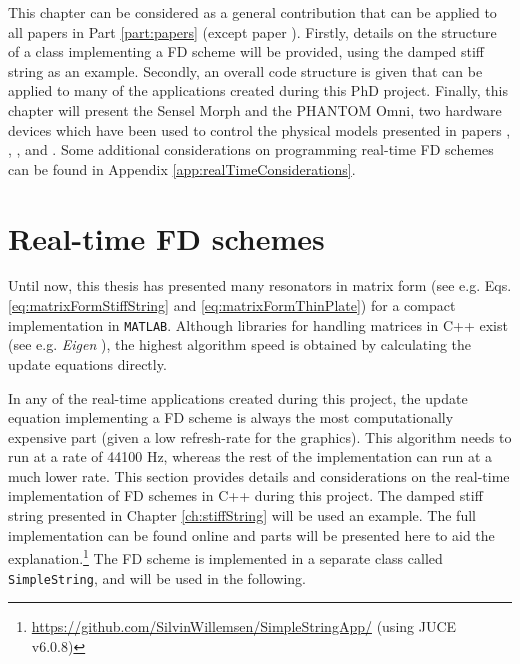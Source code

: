 This chapter can be considered as a general contribution that can be applied to all papers in Part \ref{part:papers} (except paper \citeP[G]). Firstly, details on the structure of a class implementing a FD scheme will be provided, using the damped stiff string as an example. Secondly, an overall code structure is given that can be applied to many of the applications created during this PhD project. Finally, this chapter will present the Sensel Morph and the PHANTOM Omni, two hardware devices which have been used to control the physical models presented in papers \citeP[A], \citeP[B], \citeP[C], \citeP[D] and \citeP[E]. Some additional considerations on programming real-time FD schemes can be found in Appendix \ref{app:realTimeConsiderations}.



\section{Real-time FD schemes}\label{sec:realTimeFDScheme}
Until now, this thesis has presented many resonators in matrix form (see e.g. Eqs. \eqref{eq:matrixFormStiffString} and \eqref{eq:matrixFormThinPlate}) for a compact implementation in \texttt{MATLAB}. Although libraries for handling matrices in C++ exist (see e.g. \textit{Eigen} \cite{Eigen}), the highest algorithm speed is obtained by calculating the update equations directly.

In any of the real-time applications created during this project, the update equation implementing a FD scheme is always the most computationally expensive part (given a low refresh-rate for the graphics). This algorithm needs to run at a rate of 44100 Hz, whereas the rest of the implementation can run at a much lower rate. This section provides details and considerations on the real-time implementation of FD schemes in C++ during this project. The damped stiff string presented in Chapter \ref{ch:stiffString} will be used an example. The full implementation can be found online and parts will be presented here to aid the explanation.\footnote{\url{https://github.com/SilvinWillemsen/SimpleStringApp/} (using JUCE v6.0.8)} The FD scheme is implemented in a separate class called \texttt{SimpleString}, and will be used in the following.


